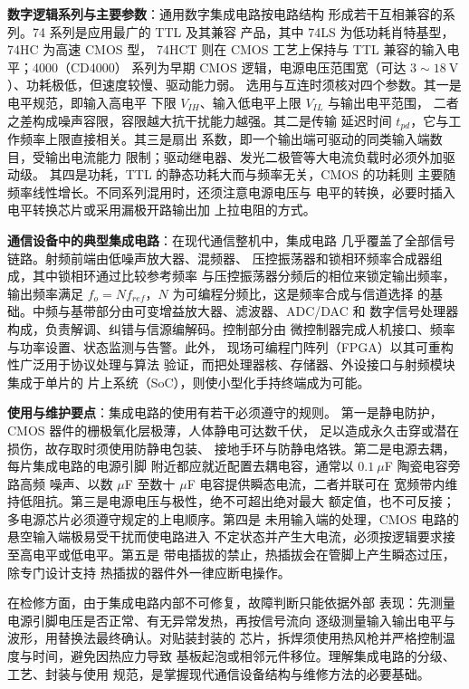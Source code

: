 \textbf{数字逻辑系列与主要参数}：通用数字集成电路按电路结构
形成若干互相兼容的系列。74 系列是应用最广的 TTL 及其兼容
产品，其中 74LS 为低功耗肖特基型，74HC 为高速 CMOS 型，
74HCT 则在 CMOS 工艺上保持与 TTL 兼容的输入电平；4000（CD4000）
系列为早期 CMOS 逻辑，电源电压范围宽（可达
$3\sim18\ \mathrm{V}$）、功耗极低，但速度较慢、驱动能力弱。
选用与互连时须核对四个参数。其一是电平规范，即输入高电平
下限 $V_{IH}$、输入低电平上限 $V_{IL}$ 与输出电平范围，
二者之差构成噪声容限，容限越大抗干扰能力越强。其二是传输
延迟时间 $t_{pd}$，它与工作频率上限直接相关。其三是扇出
系数，即一个输出端可驱动的同类输入端数目，受输出电流能力
限制；驱动继电器、发光二极管等大电流负载时必须外加驱动级。
其四是功耗，TTL 的静态功耗大而与频率无关，CMOS 的功耗则
主要随频率线性增长。不同系列混用时，还须注意电源电压与
电平的转换，必要时插入电平转换芯片或采用漏极开路输出加
上拉电阻的方式。

\textbf{通信设备中的典型集成电路}：在现代通信整机中，集成电路
几乎覆盖了全部信号链路。射频前端由低噪声放大器、混频器、
压控振荡器和锁相环频率合成器组成，其中锁相环通过比较参考频率
与压控振荡器分频后的相位来锁定输出频率，输出频率满足
$f_o = N f_{ref}$，$N$ 为可编程分频比，这是频率合成与信道选择
的基础。中频与基带部分由可变增益放大器、滤波器、ADC/DAC 和
数字信号处理器构成，负责解调、纠错与信源编解码。控制部分由
微控制器完成人机接口、频率与功率设置、状态监测与告警。此外，
现场可编程门阵列（FPGA）以其可重构性广泛用于协议处理与算法
验证，而把处理器核、存储器、外设接口与射频模块集成于单片的
片上系统（SoC），则使小型化手持终端成为可能。

\textbf{使用与维护要点}：集成电路的使用有若干必须遵守的规则。
第一是静电防护，CMOS 器件的栅极氧化层极薄，人体静电可达数千伏，
足以造成永久击穿或潜在损伤，故存取时须使用防静电包装、
接地手环与防静电烙铁。第二是电源去耦，每片集成电路的电源引脚
附近都应就近配置去耦电容，通常以 $0.1\ \mu$F 陶瓷电容旁路高频
噪声、以数 $\mu$F 至数十 $\mu$F 电容提供瞬态电流，二者并联可在
宽频带内维持低阻抗。第三是电源电压与极性，绝不可超出绝对最大
额定值，也不可反接；多电源芯片必须遵守规定的上电顺序。第四是
未用输入端的处理，CMOS 电路的悬空输入端极易受干扰而使电路进入
不定状态并产生大电流，必须按逻辑要求接至高电平或低电平。第五是
带电插拔的禁止，热插拔会在管脚上产生瞬态过压，除专门设计支持
热插拔的器件外一律应断电操作。

在检修方面，由于集成电路内部不可修复，故障判断只能依据外部
表现：先测量电源引脚电压是否正常、有无异常发热，再按信号流向
逐级测量输入输出电平与波形，用替换法最终确认。对贴装封装的
芯片，拆焊须使用热风枪并严格控制温度与时间，避免因热应力导致
基板起泡或相邻元件移位。理解集成电路的分级、工艺、封装与使用
规范，是掌握现代通信设备结构与维修方法的必要基础。
